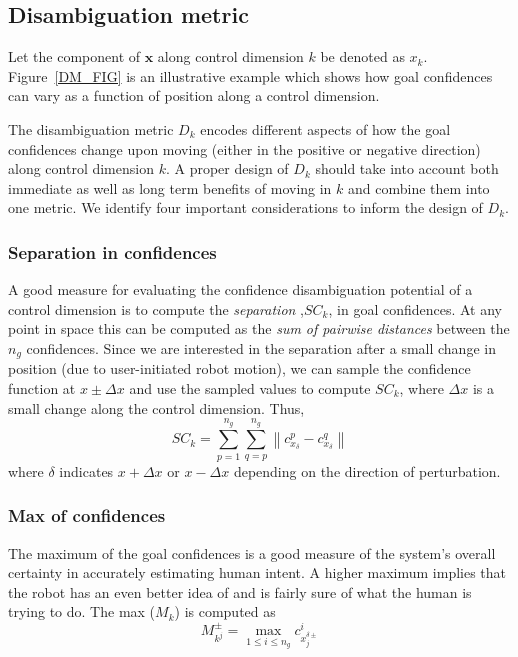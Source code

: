 \documentclass[conference]{IEEEtran}
\newcommand{\norm}[1]{\left\lVert#1\right\rVert}
\begin{document}
\subsection{Disambiguation metric}\label{DM}
Let the component of $\boldsymbol{x}$ along control dimension $k$ be denoted as $x_{k}$. 
Figure~\ref{DM_FIG} is an illustrative example which shows how goal confidences can vary as a function of position along a control dimension. 

The disambiguation metric $D_{k}$ encodes different aspects of how the goal confidences change upon moving (either in the positive or negative direction) along control dimension $k$. A proper design of $D_{k}$ should take into account both immediate as well as long term benefits of moving in $k$ and combine them into one metric. We identify four important considerations to  inform the design of $D_{k}$.

\subsubsection{Separation in confidences}
A good measure for evaluating the confidence disambiguation potential of a control dimension is to compute the \textit{separation} ,$SC_{k}$, in goal confidences. At any point in space this can be computed as the \textit{sum of pairwise distances} between the $n_g$ confidences. Since we are interested in the separation after a small change in position (due to user-initiated robot motion), we can sample the confidence function at $x\pm\Delta x$ and use the sampled values to compute $SC_{k}$, where $\Delta x$ is a small change along the control dimension. Thus,
\begin{equation*}
SC_{k} = \sum_{p=1}^{n_g}\sum_{q=p}^{n_g}\norm{c^{p}_{x_{\delta}} - c^{q}_{x_{\delta}}}
\end{equation*}
where $\delta$ indicates $x+\Delta x$ or $x-\Delta x$ depending on the direction of perturbation. 
\subsubsection{Max of confidences}
The maximum of the goal confidences is a good measure of the system's overall certainty in accurately estimating human intent. A higher maximum implies that the robot has an even better idea of and is fairly sure of what the human is trying to do. The max ($M_{k}$) is computed as
\begin{equation*}
M^{\pm}_{k^j} =\max\limits_{1 \leq i \leq n_g}c^{i}_{x_{j}^{\delta\pm}}
\end{equation*}
\end{document}
